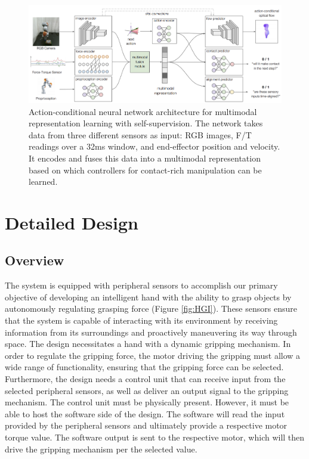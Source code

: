 \documentclass[11.5pt]{article}
\begin{document}
\begin{figure}[H]
    \centering
    \includegraphics[width=0.88\linewidth]{assets/lee.png}
    \caption{Action-conditional neural network architecture for multimodal representation learning with self-supervision. The network takes data from three different sensors as input: RGB images, F/T readings over a 32ms window, and end-effector position and velocity. It encodes and fuses this data into a multimodal representation based on which controllers for contact-rich manipulation can be learned.}
    \label{fig:lee}
\end{figure}


\newpage
\section{Detailed Design}
\subsection{Overview}
The system is equipped with peripheral sensors to accomplish our primary objective of developing an intelligent hand with the ability to grasp objects by autonomously regulating grasping force (Figure \ref{fig:HGI}). These sensors ensure that the system is capable of interacting with its environment by receiving information from its surroundings and proactively maneuvering its way through space. The design necessitates a hand with a dynamic gripping mechanism. In order to regulate the gripping force, the motor driving the gripping must allow a wide range of functionality, ensuring that the gripping force can be selected. Furthermore, the design needs a control unit that can receive input from the selected peripheral sensors, as well as deliver an output signal to the gripping mechanism. The control unit must be physically present. However, it must be able to host the software side of the design. The software will read the input provided by the peripheral sensors and ultimately provide a respective motor torque value. The software output is sent to the respective motor, which will then drive the gripping mechanism per the selected value.
\end{document}
